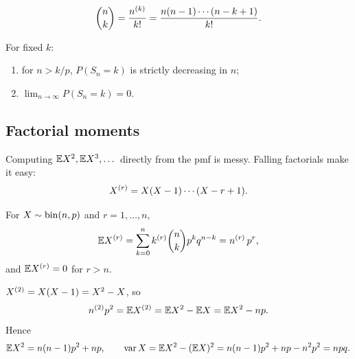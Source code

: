 \begin{corollary}
\[
\binom{n}{k} = \frac{n^{(k)}}{k!} = \frac{n(n-1)\cdots(n-k+1)}{k!}.
\]
\end{corollary}

\begin{proposition}
For fixed $k$:
\begin{enumerate}[label=(\roman*)]
  \item for $n > k/p$, $P(S_n = k)$ is strictly decreasing in $n$;
  \item $\displaystyle\lim_{n\to\infty} P(S_n = k) = 0$.
\end{enumerate}
\end{proposition}

\subsection{Factorial moments}

Computing $\mathbb{E} X^2, \mathbb{E} X^3, \dots$ directly from the pmf is messy. Falling factorials make it easy:
\[
X^{(r)} = X(X-1)\cdots(X-r+1).
\]

\begin{proposition}
For $X \sim \operatorname{bin}(n,p)$ and $r = 1,\dots,n$,
\[
\mathbb{E} X^{(r)} = \sum_{k=0}^{n} k^{(r)} \binom{n}{k} p^k q^{n-k} = n^{(r)}\, p^r,
\]
and $\mathbb{E} X^{(r)} = 0$ for $r > n$.
\end{proposition}

\begin{example}
$X^{(2)} = X(X-1) = X^2 - X$, so
\[
n^{(2)} p^2 = \mathbb{E} X^{(2)} = \mathbb{E} X^2 - \mathbb{E} X = \mathbb{E} X^2 - np.
\]
Hence
\[
\mathbb{E} X^2 = n(n-1)p^2 + np, \qquad
\operatorname{var} X = \mathbb{E} X^2 - (\mathbb{E} X)^2 = n(n-1)p^2 + np - n^2p^2 = npq.
\]
\end{example}
